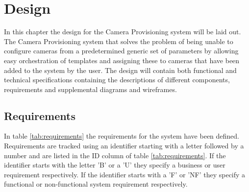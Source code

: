 \section{Design}
In this chapter the design for the Camera Provisioning system will be laid out. The Camera Provisioning system that solves the problem of being
unable to configure cameras from a predetermined generic set of parameters by allowing easy orchestration of templates and assigning these to
cameras that have been added to the system by the user. The design will contain both functional and technical specifications containing the
descriptions of different components, requirements and supplemental diagrams and wireframes.
\subsection{Requirements}
In table \ref{tab:requirements} the requirements for the system have been defined. Requirements are tracked using an identifier starting with a letter followed by a
number and are listed in the ID column of table \ref{tab:requirements}. If the identifier starts with the letter 'B' or a 'U' they specify a business or user requirement respectively. If the identifier starts with a 'F' or 'NF' they specify a functional or non-functional system requirement respectively.
